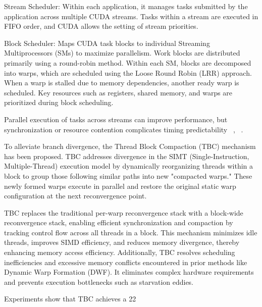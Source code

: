 Stream Scheduler: Within each application, it manages tasks submitted by the application across multiple CUDA streams. Tasks within a stream are executed in FIFO order, and CUDA allows the setting of stream priorities.

Block Scheduler: Maps CUDA task blocks to individual Streaming Multiprocessors (SMs) to maximize parallelism. Work blocks are distributed primarily using a round-robin method. Within each SM, blocks are decomposed into warps, which are scheduled using the Loose Round Robin (LRR) approach. When a warp is stalled due to memory dependencies, another ready warp is scheduled. Key resources such as registers, shared memory, and warps are prioritized during block scheduling.

Parallel execution of tasks across streams can improve performance, but synchronization or resource contention complicates timing predictability ~\cite{Bakhoda2009}, ~\cite{Sanudo2020}.

To alleviate branch divergence, the Thread Block Compaction (TBC) mechanism has been proposed. TBC addresses divergence in the SIMT (Single-Instruction, Multiple-Thread) execution model by dynamically reorganizing threads within a block to group those following similar paths into new "compacted warps." These newly formed warps execute in parallel and restore the original static warp configuration at the next reconvergence point.

TBC replaces the traditional per-warp reconvergence stack with a block-wide reconvergence stack, enabling efficient synchronization and compaction by tracking control flow across all threads in a block. This mechanism minimizes idle threads, improves SIMD efficiency, and reduces memory divergence, thereby enhancing memory access efficiency. Additionally, TBC resolves scheduling inefficiencies and excessive memory conflicts encountered in prior methods like Dynamic Warp Formation (DWF). It eliminates complex hardware requirements and prevents execution bottlenecks such as starvation eddies.

Experiments show that TBC achieves a 22%

